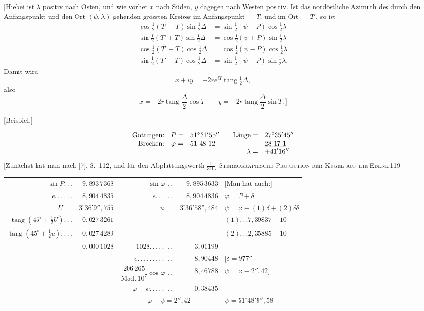 [Hiebei ist $\lambda$ positiv nach Osten, und wie vorher $x$ nach Süden, $y$ dagegen nach Westen positiv. Ist das nordöstliche Azimuth des durch den Anfangspunkt und den Ort $(\psi,\lambda)$ gehenden grössten Kreises im Anfangspunkt $=T$, und im Ort $=T'$, so ist
\[
\begin{aligned}
\cos\tfrac12(T'+T)\sin\tfrac12\Delta&=\sin\tfrac12(\psi-P)\cos\tfrac12\lambda\\
\sin\tfrac12(T'+T)\sin\tfrac12\Delta&=\cos\tfrac12(\psi+P)\sin\tfrac12\lambda\\
\cos\tfrac12(T'-T)\cos\tfrac12\Delta&=\cos\tfrac12(\psi-P)\cos\tfrac12\lambda\\
\sin\tfrac12(T'-T)\cos\tfrac12\Delta&=\sin\tfrac12(\psi+P)\sin\tfrac12\lambda.
\end{aligned}
\]
Damit wird
\[
x+iy=-2re^{iT}\operatorname{tang}\tfrac12\Delta,
\]
also
\[
x=-2r\operatorname{tang}\frac\Delta2\cos T\qquad y=-2r\operatorname{tang}\frac\Delta2\sin T.\,]
\]
\begin{center}[Beispiel.]\end{center}
\[
\begin{array}{rcl@{\qquad}rl}
\text{Göttingen:}&P=&51^\circ31'55''&\text{Länge}=&27^\circ35'45''\\
\text{Brocken:}&\varphi=&51\ 48\ 12&&\underline{28\ 17\ 1}\\
&&&\lambda=&+41'16''
\end{array}
\]
[Zunächst hat man nach [7], S.~112, und für den Abplattungswerth $\tfrac1{310}$]
\clearpage
\noindent\mbox{}\hfill{\small\textsc{Stereographische Projection der Kugel auf die Ebene.}}\hfill119\par\medskip
\begin{center}
\begingroup\fontsize{8}{11}\selectfont\setlength{\tabcolsep}{3pt}\renewcommand{\arraystretch}{1.4}
\begin{tabular}{@{}r@{ }r@{\quad}r@{ }r@{\quad}l@{}}
$\sin P.\,.\,.$&$9{,}893\,7368$&$\sin\varphi.\,.\,.$&$9{,}895\,3633$&[Man hat auch:]\\
$e.\,.\,.\,.\,.\,.$&$8{,}904\,4836$&$e.\,.\,.\,.\,.\,.$&$8{,}904\,4836$&$\varphi=P+\delta$\\
$U=$&$3^\circ36'9''{,}755$&$u=$&$3^\circ36'58''{,}484$&$\psi=\varphi-(1)\delta+(2)\delta\delta$\\
$\operatorname{tang}(45^\circ+\tfrac12U).\,.\,.$&$0{,}027\,3261$&&&$(1).\,.\,. 7{,}39837-10$\\
$\operatorname{tang}(45^\circ+\tfrac12u).\,.\,.\,.$&$\underline{0{,}027\,4289}$&&&$(2).\,.\,. 2{,}35885-10$\\
&$0{,}000\,1028$&$1028.\,.\,.\,.\,.\,.\,.\,.$&$3{,}01199$&\\
&&$e.\,.\,.\,.\,.\,.\,.\,.\,.\,.\,.\,.$&$8{,}90448$&$[\delta=977''$\\
&&$\dfrac{206\,265}{\mathrm{Mod.}\,10^7}\cos\varphi.\,.\,.$&$\underline{8{,}46788}$&$\psi=\varphi-2''{,}42]$\\
&&$\varphi-\psi.\,.\,.\,.\,.\,.\,.\,.$&$0{,}38435$&\\
&&\multicolumn{2}{c}{$\varphi-\psi=2''{,}42$}&$\psi=51^\circ48'9''{,}58$
\end{tabular}\par\endgroup
\end{center}
